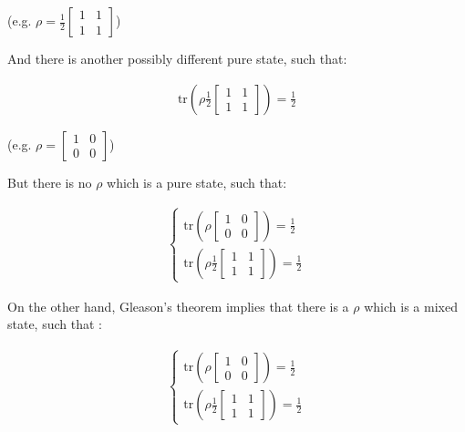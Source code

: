 \documentclass[11pt]{book}
\begin{document}
(e.g.
\(\rho=\frac{1}{2}\left[\begin{smallmatrix} 1 & 1\\ 1 & 1 \end{smallmatrix}\right]\))

And there is another possibly different pure state, such that:

\begin{equation}\begin{aligned}
\mathrm{tr}(\rho \frac{1}{2}\left[\begin{smallmatrix} 1 & 1\\ 1 & 1 \end{smallmatrix}\right])=\frac{1}{2}\end{aligned}\end{equation}

(e.g.
\(\rho=\left[\begin{smallmatrix} 1 & 0\\ 0 & 0 \end{smallmatrix}\right]\))

But there is no \(\rho\) which is a pure state, such that:

\begin{equation}\begin{aligned}
\begin{cases}
\mathrm{tr}(\rho \left[\begin{smallmatrix} 1 & 0\\ 0 & 0 \end{smallmatrix}\right])=\frac{1}{2}\\
\mathrm{tr}(\rho \frac{1}{2}\left[\begin{smallmatrix} 1 & 1\\ 1 & 1 \end{smallmatrix}\right])=\frac{1}{2}
\end{cases}\end{aligned}\end{equation}

On the other hand, Gleason's theorem implies that there is a \(\rho\)
which is a mixed state, such that :

\begin{equation}\begin{aligned}
\begin{cases}
\mathrm{tr}(\rho \left[\begin{smallmatrix} 1 & 0\\ 0 & 0 \end{smallmatrix}\right])=\frac{1}{2}\\
\mathrm{tr}(\rho \frac{1}{2}\left[\begin{smallmatrix} 1 & 1\\ 1 & 1 \end{smallmatrix}\right])=\frac{1}{2}
\end{cases}\end{aligned}\end{equation}
\end{document}
